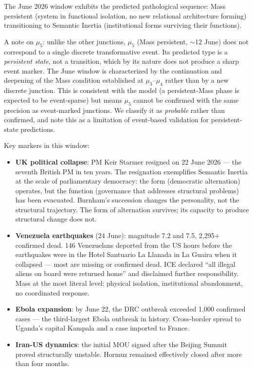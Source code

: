 \documentclass[12pt,a4paper]{article}
\begin{document}
The June 2026 window exhibits the predicted pathological sequence: Mass persistent (system in functional isolation, no new relational architecture forming) transitioning to Semantic Inertia (institutional forms surviving their functions).

A note on $\mu_5$: unlike the other junctions, $\mu_5$ (Mass persistent, $\sim$12 June) does not correspond to a single discrete transformative event. Its predicted type is a \emph{persistent state}, not a transition, which by its nature does not produce a sharp event marker. The June window is characterized by the continuation and deepening of the Mass condition established at $\mu_3$--$\mu_4$ rather than by a new discrete junction. This is consistent with the model (a persistent-Mass phase is expected to be event-sparse) but means $\mu_5$ cannot be confirmed with the same precision as event-marked junctions. We classify it as \emph{probable} rather than confirmed, and note this as a limitation of event-based validation for persistent-state predictions.

Key markers in this window:

\begin{itemize}[leftmargin=2em]
    \item \textbf{UK political collapse}: PM Keir Starmer resigned on 22 June 2026 --- the seventh British PM in ten years. The resignation exemplifies Semantic Inertia at the scale of parliamentary democracy: the form (democratic alternation) operates, but the function (governance that addresses structural problems) has been evacuated. Burnham's succession changes the personality, not the structural trajectory. The form of alternation survives; its capacity to produce structural change does not.
    \item \textbf{Venezuela earthquakes} (24 June): magnitude 7.2 and 7.5, 2,295+ confirmed dead. 146 Venezuelans deported from the US hours before the earthquakes were in the Hotel Santuario La Llanada in La Guaira when it collapsed --- most are missing or confirmed dead. ICE declared ``all illegal aliens on board were returned home'' and disclaimed further responsibility. Mass at the most literal level: physical isolation, institutional abandonment, no coordinated response.
    \item \textbf{Ebola expansion}: by June 22, the DRC outbreak exceeded 1,000 confirmed cases --- the third-largest Ebola outbreak in history. Cross-border spread to Uganda's capital Kampala and a case imported to France.
    \item \textbf{Iran-US dynamics}: the initial MOU signed after the Beijing Summit proved structurally unstable. Hormuz remained effectively closed after more than four months.
\end{itemize}
\end{document}
